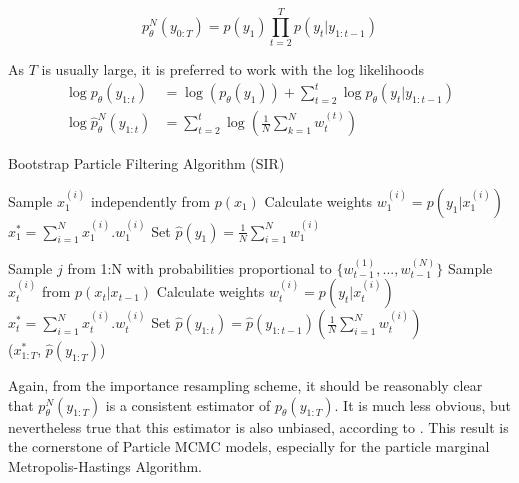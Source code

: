 \documentclass[11pt,a4,twosided,singlespacing,titlepagenumber=on]{scrreprt}
\numberwithin{equation}{chapter} %
\theoremstyle{remark}
\begin{document}
$$ p^N_{\theta}(y_{0:T}) = p(y_1)\prod_{t=2}^T p(y_t | y_{1:t-1})$$

As $T$ is usually large, it is preferred to work with the log likelihoods
\begin{align*}
\log p_{\theta}(y_{1:t}) &= \log(p_\theta(y_1)) + \sum_{t=2}^t \log p_\theta(y_t | y_{1:t-1}) \\
\log \hat{p}^N_{\theta}(y_{1:t}) &= \sum_{t=2}^t \log \left(\frac{1}{N} \sum_{k=1}^N w_t^{(t)} \right)
\end{align*}

\begin{algorithm}
\caption{Bootstrap Particle Filtering Algorithm (SIR)}\label{euclid}
\begin{algorithmic}[1]
	\State Sample $x_1^{(i)}$ independently from $p(x_1)$
	\State Calculate weights $w_1^{(i)} = p(y_1 | x_1^{(i)})$
\State $x^*_1 = \sum_{i=1}^N x_1^{(i)}.w_1^{(i)}$
\State Set $\hat{p}(y_1) = \frac{1}{N} \sum_{i=1}^N w_1^{(i)}$

		\State Sample $j$ from 1:N with probabilities proportional to $\{w_{t-1}^{(1)},..., w_{t-1}^{(N)}\}$
		\State Sample $x_t^{(i)}$ from $p(x_t|x_{t-1})$
		\State Calculate weights $w_t^{(i)} = p(y_t|x_t^{(i)})$
	\State $x^*_t = \sum_{i=1}^N x_t^{(i)}.w_t^{(i)}$
	\State Set $\hat{p}(y_{1:t}) = \hat{p}(y_{1:t-1}) \left(\frac{1}{N} \sum_{i=1}^N w_t^{(i)} \right)$
\\
\Return ($x^*_{1:T}$, $\hat{p}(y_{1:T})$)
\EndProcedure
\end{algorithmic}
\end{algorithm}

Again, from the importance resampling scheme, it should be reasonably clear that $p^N_{\theta}(y_{1:T})$ is a consistent estimator of $p_{\theta}(y_{1:T})$. It is much less obvious, but nevertheless true that this estimator is also unbiased, according to \cite{delmoral2004}. This result is the cornerstone of Particle MCMC models, especially for the particle marginal Metropolis-Hastings Algorithm.
\end{document}

